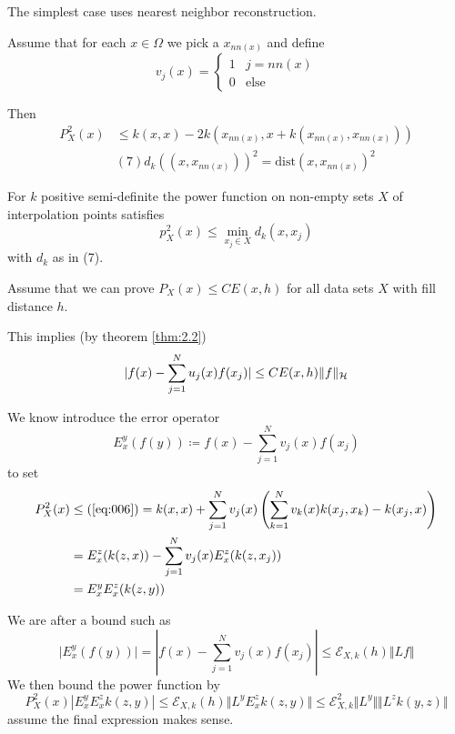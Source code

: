 The simplest case uses nearest neighbor reconstruction. 

Assume that for each $x\in\Omega$ we pick a $x_{nn(x)}$ and define 
\[v_j(x)=\begin{cases}
    1 & j=nn(x)\\
    0 & \text{else}
\end{cases}\]

Then 
\begin{align*}
    P_X^2(x)&\leq k(x,x)-2k(x_{nn(x)},x+k(x_{nn(x)},x_{nn(x)}))\\
    &\stackrel{}{(7)}d_k((x,x_{nn(x)}))^2=\text{dist}(x,x_{nn(x)})^2
\end{align*}

\begin{theorem}\label{thm2.8}
    For $k$ positive semi-definite the power function on 
    non-empty sets $X$ of interpolation points satisfies 
    \[p_X^2(x)\leq \min_{x_j\in X} d_k(x,x_j)\] 
    with $d_k$ as in (7). %
\end{theorem}


Assume that we can prove $P_X(x)\leq CE(x,h)$ for all 
data sets $X$ with fill distance $h$.

This implies (by theorem \ref{thm:2.2})
\begin{align*}
    |f(x)-\sum_{j=1}^N u_j(x)f(x_j)|\leq CE(x,h)\Vert f\Vert_{\mathcal{H}}
\end{align*}


We know introduce the error operator 
\[E_x^y(f(y))\coloneqq f(x)-\sum_{j=1}^Nv_j(x)f(x_j)\]
to set 
\begin{align*}
    P_X^2(x)&\leq (\ref{eq:006})=k(x,x)+\sum_{j=1}^N v_j(x)\left(\sum_{k=1}^{N}v_k(x)k(x_j,x_k)-k(x_j,x)\right)\\
    &=E_x^z(k(z,x))-\sum_{j=1}^N v_j(x)E_x^z(k(z,x_j))\\
    &=E_x^yE_x^z(k(z,y))
\end{align*}

We are after a bound such as 
\[\vert E_x^y(f(y))\vert =\left\vert f(x)-\sum_{j=1}^N v_j(x)f(x_j) \right\vert\leq \mathcal{E}_{X,k}(h)\Vert L f\Vert \]
We then bound the power function by 
\[P_X^2(x)\left\vert E_x^yE_x^z k(z,y) \right\vert\leq \mathcal{E}_{X,k}(h)\Vert L^y E_x^z k(z,y)\Vert\leq \mathcal{E}_{X,k}^2\Vert L^y\Vert \Vert L^z k(y,z)\Vert \]
assume the final expression makes sense.



